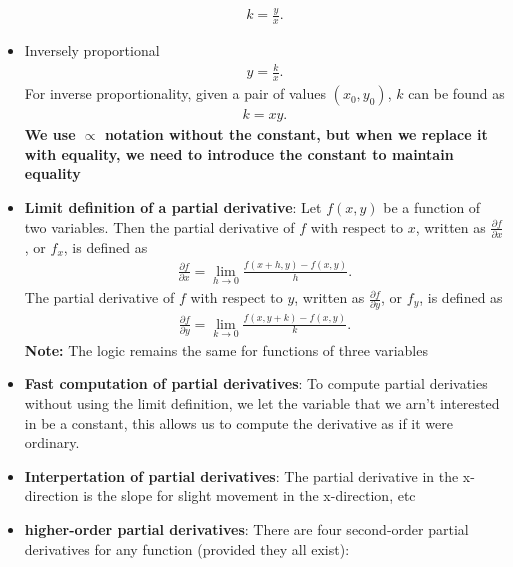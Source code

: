 \documentclass{report}
\begin{document}
\begin{itemize}
\begin{align*}
                    k = \frac{y}{x}
                .\end{align*}
                \item Inversely proportional
                \begin{align*}
                    y = \frac{k}{x}
                .\end{align*}
                For inverse proportionality, given a pair of values $(x_{0}, y_{0})$, $k$ can be found as 
                \begin{align*}
                    k=xy
                .\end{align*}
                \bigbreak \noindent 
                \textbf{We use $\propto$ notation without the constant, but when we replace it with equality, we need to introduce the constant to maintain equality}
            \item \textbf{Limit definition of a partial derivative}:
                Let $f(x,y)$ be a function of two variables. Then the partial derivative of $f$ with respect to $x$, written as $\frac{\partial f}{\partial x}$, or $f_x$, is defined as
                \begin{align*}
                    \frac{\partial f}{\partial x} = \lim_{h \to 0} \frac{f(x+h,y) - f(x,y)}{h}
                .\end{align*}
                The partial derivative of $f$ with respect to $y$, written as $\frac{\partial f}{\partial y}$, or $f_y$, is defined as
                \begin{align*}
                    \frac{\partial f}{\partial y} = \lim_{k \to 0} \frac{f(x,y+k) - f(x,y)}{k}
                .\end{align*}
                \bigbreak \noindent 
                \textbf{Note:} The logic remains the same for functions of three variables
            \item \textbf{Fast computation of partial derivatives}: To compute partial derivaties without using the limit definition, we let the variable that we arn't interested in be a constant, this allows us to compute the derivative as if it were ordinary.
            \item \textbf{Interpertation of partial derivatives}: The partial derivative in the x-direction is the slope for slight movement in the x-direction, etc
            \item \textbf{higher-order partial derivatives}:
                There are four second-order partial derivatives for any function (provided they all exist):
                \begin{align*}

\end{align*}
\end{itemize}
\end{document}
